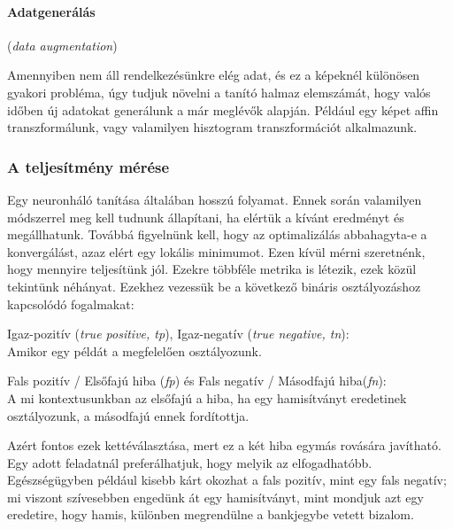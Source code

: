 \paragraph{Adatgenerálás} (\textit{data augmentation})

Amennyiben nem áll rendelkezésünkre elég adat, és ez a képeknél 
különösen gyakori probléma, úgy tudjuk növelni a tanító halmaz
elemszámát, hogy valós időben új adatokat generálunk a már
meglévők alapján. Például egy képet affin transzformálunk,
vagy valamilyen hisztogram transzformációt alkalmazunk.


\subsubsection{A teljesítmény mérése}

Egy neuronháló tanítása általában hosszú folyamat. Ennek során valamilyen módszerrel meg kell
tudnunk állapítani, ha elértük a kívánt eredményt és megállhatunk. Továbbá figyelnünk kell, 
hogy az optimalizálás abbahagyta-e a konvergálást, azaz elért egy 
lokális minimumot.
Ezen kívül mérni szeretnénk, hogy mennyire teljesítünk jól. 
Ezekre többféle metrika is létezik, ezek közül tekintünk néhányat.
Ezekhez vezessük be a következő bináris osztályozáshoz kapcsolódó fogalmakat:


Igaz-pozitív (\textit{true positive, tp}), 
Igaz-negatív (\textit{true negative, tn}): \\
Amikor egy példát a megfelelően osztályozunk.

Fals pozitív / Elsőfajú hiba (\textit{fp}) 
és Fals negatív / Másodfajú hiba(\textit{fn}): \\
A mi kontextusunkban az elsőfajú a hiba, ha egy hamisítványt eredetinek
osztályozunk, a másodfajú ennek fordítottja.

Azért fontos ezek kettéválasztása, mert ez a két hiba egymás rovására 
javítható. Egy adott feladatnál preferálhatjuk, hogy melyik az elfogadhatóbb.
Egészségügyben például kisebb kárt okozhat a fals pozitív, mint egy fals negatív;
mi viszont szívesebben engedünk át egy hamisítványt, mint mondjuk  azt egy eredetire, hogy hamis,
különben megrendülne a bankjegybe vetett bizalom.







